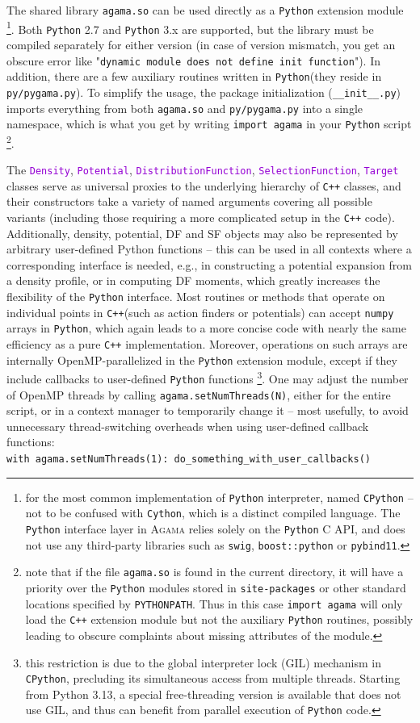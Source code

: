 \documentclass[12pt]{article}
\newcommand{\Agama}{\textsc{Agama}\xspace}
\newcommand{\Cpp}  {\texttt{C++}\xspace}
\newcommand{\Python}{\texttt{Python}\xspace}
\newcommand{\ttt}[1]{\textcolor{darkviolet}{\texttt{#1}}}
\begin{document}
The shared library \texttt{agama.so} can be used directly as a \Python extension module%
\footnote{for the most common implementation of \Python interpreter, named \texttt{CPython} -- not to be confused with \texttt{Cython}, which is a distinct compiled language. The \Python interface layer in \Agama relies solely on the \Python C API, and does not use any third-party libraries such as \texttt{swig}, \texttt{boost::python} or \texttt{pybind11}.}. Both \Python 2.7 and \Python 3.x are supported, but the library must be compiled separately for either version (in case of version mismatch, you get an obscure error like "\texttt{dynamic module does not define init function}"). In addition, there are a few auxiliary routines written in \Python (they reside in \texttt{py/pygama.py}). To simplify the usage, the package initialization (\texttt{__init__.py}) imports everything from both \texttt{agama.so} and \texttt{py/pygama.py} into a single namespace, which is what you get by writing \texttt{import agama} in your \Python script%
\footnote{note that if the file \texttt{agama.so} is found in the current directory, it will have a priority over the \Python modules stored in \texttt{site-packages} or other standard locations specified by \texttt{PYTHONPATH}. Thus in this case \texttt{import agama} will only load the \Cpp extension module but not the auxiliary \Python routines, possibly leading to obscure complaints about missing attributes of the module.}.

The \ttt{Density}, \ttt{Potential}, \ttt{DistributionFunction}, \ttt{SelectionFunction}, \ttt{Target} classes serve as universal proxies to the underlying hierarchy of \Cpp classes, and their constructors take a variety of named arguments covering all possible variants (including those requiring a more complicated setup in the \Cpp code).
Additionally, density, potential, DF and SF objects may also be represented by arbitrary user-defined Python functions -- this can be used in all contexts where a corresponding interface is needed, e.g., in constructing a potential expansion from a density profile, or in computing DF moments, which greatly increases the flexibility of the \Python interface. Most routines or methods that operate on individual points in \Cpp (such as action finders or potentials) can accept \texttt{numpy} arrays in \Python, which again leads to a more concise code with nearly the same efficiency as a pure \Cpp implementation. Moreover, operations on such arrays are internally OpenMP-parallelized in the \Python extension module, except if they include callbacks to user-defined \Python functions%
\footnote{this restriction is due to the global interpreter lock (GIL) mechanism in \texttt{CPython}, precluding its simultaneous access from multiple threads. Starting from Python 3.13, a special free-threading version is available that does not use GIL, and thus can benefit from parallel execution of \Python code.}. One may adjust the number of OpenMP threads by calling \texttt{agama.setNumThreads(N)}, either for the entire script, or in a context manager to temporarily change it -- most usefully, to avoid unnecessary thread-switching overheads when using user-defined callback functions:\\
\texttt{with agama.setNumThreads(1): do_something_with_user_callbacks()}
\end{document}

